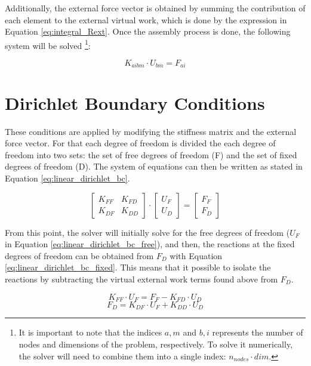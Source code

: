 Additionally, the external force vector is obtained by summing the contribution of each element to the external virtual work, which is done by the expression in Equation \ref{eq:integral_Rext}. Once the assembly process is done, the following system will be solved \footnote{It is important to note that the indices $a, m$ and $b, i$ represents the number of nodes and dimensions of the problem, respectively. To solve it numerically, the solver will need to combine them into a single index: $n_{nodes} \cdot dim$.}:

\begin{equation}
    K_{aibm} \cdot U_{bm} = F_{ai} 
\end{equation}

\section{Dirichlet Boundary Conditions} \label{sec:linear_solution_dirichlet}

These conditions are applied by modifying the stiffness matrix and the external force vector. For that each degree of freedom is divided the each degree of freedom into two sets: the set of free degrees of freedom (F) and the set of fixed degrees of freedom (D). The system of equations can then be written as stated in Equation \ref{eq:linear_dirichlet_bc}.

\begin{equation} \label{eq:linear_dirichlet_bc}
    \begin{bmatrix}
    K_{FF} & K_{FD} \\
    K_{DF} & K_{DD}
    \end{bmatrix} \cdot
    \begin{bmatrix}
    U_F \\
    U_D
    \end{bmatrix} =
    \begin{bmatrix}
    F_F \\
    F_D
    \end{bmatrix}
\end{equation}

From this point, the solver will initially solve for the free degrees of freedom ($U_F$ in  Equation \ref{eq:linear_dirichlet_bc_free}), and then, the reactions at the fixed degrees of freedom can be obtained from $F_D$ with Equation \ref{eq:linear_dirichlet_bc_fixed}. This means that it possible to isolate the reactions by subtracting the virtual external work terms found above from $F_D$.

\begin{equation} \label{eq:linear_dirichlet_bc_free}
    K_{FF} \cdot U_F = F_F - K_{FD} \cdot U_D
\end{equation}
\begin{equation} \label{eq:linear_dirichlet_bc_fixed}
    F_D = K_{DF} \cdot U_F + K_{DD} \cdot U_D
\end{equation}
